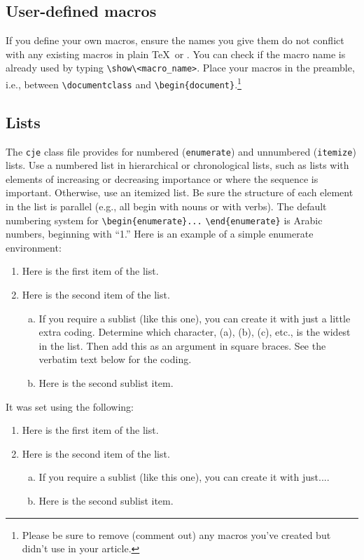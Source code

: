 \documentclass{cje}          %
\theoremstyle{plain}%
\theoremstyle{definition}
\theoremstyle{remark}
\begin{document}
\subsection{User-defined macros}
If you define your own macros, ensure the names you give them do not conflict with any existing macros in plain \TeX\ or \LaTeXe. You can check if the macro name is already used by typing \verb"\show\<macro_name>". Place your macros in the preamble, i.e., between \verb"\documentclass" and \verb"\begin{document}".\footnote{Please be sure to remove (comment out) any macros you've created but didn't use in your article.}

\subsection{Lists}
The \texttt{cje} class file provides for numbered (\verb"enumerate") and unnumbered (\verb"itemize") lists. Use a numbered list in hierarchical or chronological lists, such as lists with elements of increasing or decreasing importance or where the sequence is important. Otherwise, use an itemized list. Be sure the structure of each element in the list is parallel (e.g., all begin with nouns or with verbs). The default numbering system for \verb"\begin{enumerate}..." \verb"\end{enumerate}" is Arabic numbers, beginning with ``1.'' Here is an example of a simple enumerate environment:
\begin{enumerate}
\item Here is the first item of the list.
\item Here is the second item of the list.
  \begin{enumerate}[(b)]
    \item If you require a sublist (like this one), you can create it with just a little extra coding. Determine which character, (a), (b), (c), etc., is the widest in the list. Then add this as an argument in square braces. See the verbatim text below for the coding.
    \item Here is the second sublist item.
  \end{enumerate}
\end{enumerate}
It was set using the following:
\begin{smallverbatim}
\begin{enumerate}
\item Here is the first item of the list.
\item Here is the second item of the list.
  \begin{enumerate}[(b)]
    \item If you require a sublist (like this one), you can create it with just....
    \item Here is the second sublist item.
  \end{enumerate}
\end{enumerate}
\end{smallverbatim}
\end{document}
